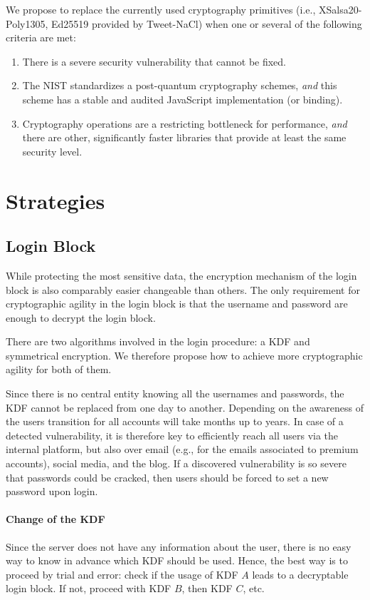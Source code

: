 \documentclass[a4paper, 11pt]{article}
\begin{document}
We propose to replace the currently used cryptography primitives (i.e., XSalsa20-Poly1305, Ed25519 provided by Tweet-NaCl) when one or several of the following criteria are met:

\begin{enumerate}
  \item There is a severe security vulnerability that cannot be fixed.
  \item The \ac{NIST} standardizes a post-quantum cryptography schemes, \textit{and} this scheme has a stable and audited JavaScript implementation (or binding).
  \item Cryptography operations are a restricting bottleneck for performance, \textit{and} there are other, significantly faster libraries that provide at least the same security level.
\end{enumerate}


\section{Strategies}
\subsection{Login Block}
\label{sec:login_block}

While protecting the most sensitive data, the encryption mechanism of the login block is also comparably easier changeable than others.
The only requirement for cryptographic agility in the login block is that the username and password are enough to decrypt the login block.

There are two algorithms involved in the login procedure: a \ac{KDF} and symmetrical encryption.
We therefore propose how to achieve more cryptographic agility for both of them.

Since there is no central entity knowing all the usernames and passwords, the \ac{KDF} cannot be replaced from one day to another.
Depending on the awareness of the users transition for all accounts will take months up to years.
In case of a detected vulnerability, it is therefore key to efficiently reach all users via the internal platform, but also over email (e.g., for the emails associated to premium accounts), social media, and the blog.
If a discovered vulnerability is so severe that passwords could be cracked, then users should be forced to set a new password upon login.

\paragraph{Change of the \ac{KDF}}
Since the server does not have any information about the user, there is no easy way to know in advance which \ac{KDF} should be used.
Hence, the best way is to proceed by trial and error: check if the usage of \ac{KDF} $A$ leads to a decryptable login block.
If not, proceed with \ac{KDF} $B$, then \ac{KDF} $C$, etc.
\end{document}
